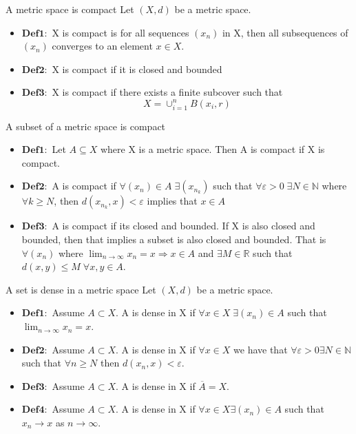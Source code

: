 \documentclass[a4paper,norsk]{article}
\renewcommand{\geq}{\geqslant}
\renewcommand{\leq}{\leqslant}
\renewcommand{\epsilon}{\varepsilon}
\begin{document}
\begin{oppgavebox}{A metric space is compact}{}
Let $ \left( X, d \right)  $ be a metric space. 

\begin{itemize}
  \item $\mathbf{Def1:}$ X is compact is for all sequences $ \left( x_n \right)  $ in X, then all subsequences of $ \left( x_n \right)  $ converges to an element $ x \in X $.
  \item $\mathbf{Def2:}$ X is compact if it is closed and bounded
  \item $\mathbf{Def3:}$ X is compact if there exists a finite subcover such that 
  \[
      X = \cup_{i=1}^n B \left( x_i, r \right) 
  \]
  
\end{itemize}
\end{oppgavebox}

\begin{oppgavebox}{A subset of a metric space is compact}{}
\begin{itemize}
  \item $ \mathbf{Def1:}$ Let $ A \subseteq X $ where X is a metric space. Then A is compact if X is compact. 
  \item $ \mathbf{Def2:} $ A is compact if $ \forall \left( x_n \right) \in A \; \exists  \left( x_{n_k} \right) $     such that $ \forall \epsilon > 0 \; \exists N \in \mathbb{N} $ where $ \forall k \geq N $, then $ d \left( x_{n_k}, x \right) < \epsilon   $  implies that $ x \in A $ 
  \item $ \mathbf{Def3:} $ A is compact if its closed and bounded. If X is also closed and bounded, then that implies a subset is also closed and bounded. That is $ \forall \left( x_n \right)   $ where $ \lim_{n \to \infty} x_n = x \Rightarrow  x \in A  $ and $ \exists M \in \mathbb{R} $ such that $ d(x, y) \leq M \; \forall x,  y \in A $.
\end{itemize}

\end{oppgavebox}


\begin{oppgavebox}{A set is dense in a metric space}{}
Let $ \left( X, d \right)  $ be a metric space.
\begin{itemize}
  \item $ \mathbf{Def1:} $ Assume $ A \subset X $. A is dense in X if $ \forall x \in X \; \exists \left( x_n \right) \in A $ such that $ \lim_{n \to \infty} x_n = x  $. 
  \item $ \mathbf{Def2:} $ Assume $ A \subset X $. A is dense in X if $ \forall x \in X $ we have that $ \forall  \epsilon > 0 \exists N \in \mathbb{N} $  such that $ \forall n \geq N $ then $ d \left( x_n, x \right) < \epsilon  $.  
  \item $ \mathbf{Def3:} $ Assume $ A \subset X $. A is dense in X if $ \overline{A} = X $.
  \item $ \mathbf{Def4:} $ Assume $ A \subset X $. A is dense in X if $ \forall x \in X \exists \left( x_n \right) \in  A  $   such that $ x_n \to x $ as $ n \to \infty $.
\end{itemize}
\end{oppgavebox}
\end{document}
